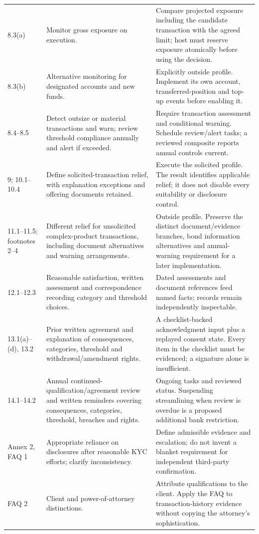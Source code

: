 \begin{longtable}{P{0.14\textwidth}P{0.37\textwidth}P{0.39\textwidth}}
8.3(a) & Monitor gross exposure on execution. & Compare projected exposure including the candidate transaction with the agreed limit; host must reserve exposure atomically before using the decision.\\
8.3(b) & Alternative monitoring for designated accounts and new funds. & Explicitly outside profile. Implement its own account, transferred-position and top-up events before enabling it.\\
8.4--8.5 & Detect outsize or material transactions and warn; review threshold compliance annually and alert if exceeded. & Require transaction assessment and conditional warning. Schedule review/alert tasks; a reviewed composite reports annual controls current.\\
9; 10.1--10.4 & Define solicited-transaction relief, with explanation exceptions and offering documents retained. & Execute the solicited profile. The result identifies applicable relief; it does not disable every suitability or disclosure control.\\
11.1--11.5; footnotes 2--4 & Different relief for unsolicited complex-product transactions, including document alternatives and warning arrangements. & Outside profile. Preserve the distinct document/evidence branches, bond information alternatives and annual-warning requirement for a later implementation.\\
12.1--12.3 & Reasonable satisfaction, written assessment and correspondence recording category and threshold choices. & Dated assessments and document references feed named facts; records remain independently inspectable.\\
13.1(a)--(d), 13.2 & Prior written agreement and explanation of consequences, categories, threshold and withdrawal/amendment rights. & A checklist-backed acknowledgment input plus a replayed consent state. Every item in the checklist must be evidenced; a signature alone is insufficient.\\
14.1--14.2 & Annual continued-qualification/agreement review and written reminders covering consequences, categories, threshold, breaches and rights. & Ongoing tasks and reviewed status. Suspending streamlining when review is overdue is a proposed additional bank restriction.\\
Annex 2, FAQ 1 & Appropriate reliance on disclosures after reasonable KYC efforts; clarify inconsistency. & Define admissible evidence and escalation; do not invent a blanket requirement for independent third-party confirmation.\\
FAQ 2 & Client and power-of-attorney distinctions. & Attribute qualifications to the client. Apply the FAQ to transaction-history evidence without copying the attorney's sophistication.\\

\end{longtable}

